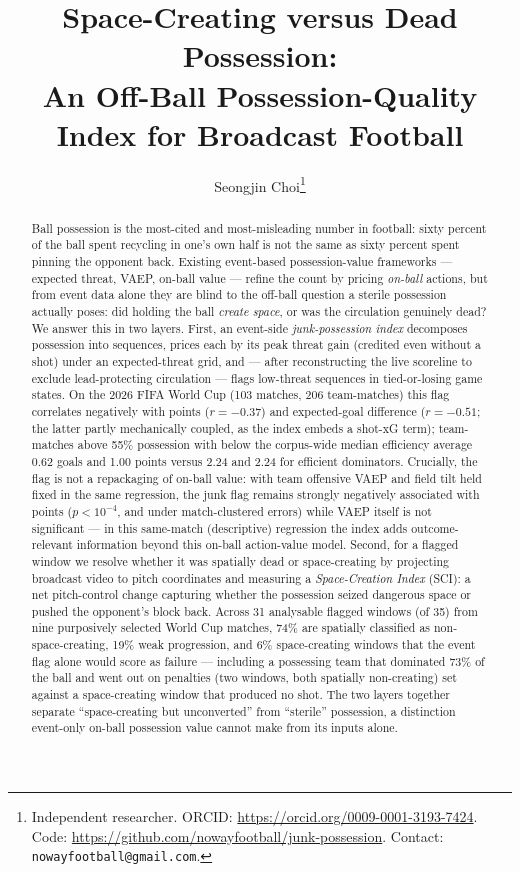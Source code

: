 \documentclass[11pt]{article}
\title{Space-Creating versus Dead Possession:\\An Off-Ball Possession-Quality Index for Broadcast Football}
\author{%
  Seongjin Choi\thanks{Independent researcher.
  ORCID: \url{https://orcid.org/0009-0001-3193-7424}.
  Code: \url{https://github.com/nowayfootball/junk-possession}.
  Contact: \texttt{nowayfootball@gmail.com}.}%
}
\date{}
\begin{document}
\maketitle

\begin{abstract}
Ball possession is the most-cited and most-misleading number in football:
sixty percent of the ball spent recycling in one's own half is not the same as
sixty percent spent pinning the opponent back. Existing event-based possession-value
frameworks --- expected threat, VAEP, on-ball value --- refine the count by
pricing \emph{on-ball} actions, but from event data alone they are blind to the
off-ball question a
sterile possession actually poses: did holding the ball \emph{create space},
or was the circulation genuinely dead? We answer this in two layers. First, an
event-side \emph{junk-possession index} decomposes possession into sequences,
prices each by its peak threat gain (credited even without a shot) under an expected-threat
grid, and --- after reconstructing the live scoreline to exclude
lead-protecting circulation --- flags low-threat sequences in tied-or-losing
game states. On the 2026 FIFA World Cup (103 matches, 206 team-matches) this
flag correlates negatively with points ($r=-0.37$) and expected-goal
difference ($r=-0.51$; the latter partly mechanically coupled, as the index
embeds a shot-xG term); team-matches above 55\% possession with below the
corpus-wide median efficiency average 0.62 goals and 1.00 points versus 2.24 and
2.24 for efficient dominators. Crucially, the flag is not a repackaging of
on-ball value: with team offensive VAEP and field tilt held fixed in the same
regression, the junk flag remains strongly negatively associated with points
($p<10^{-4}$, and under match-clustered errors) while VAEP itself is not
significant --- in this same-match (descriptive) regression the index adds
outcome-relevant information beyond this on-ball action-value model. Second, for
a flagged
window we resolve whether it was spatially dead or space-creating by projecting
broadcast video to pitch
coordinates and measuring a \emph{Space-Creation Index} (SCI): a net
pitch-control change capturing whether the possession seized dangerous space or
pushed the opponent's block back. Across 31 analysable flagged windows (of 35)
from nine purposively selected World Cup matches, 74\% are spatially classified
as non-space-creating,
19\% weak progression, and 6\% space-creating windows that the event flag alone
would score as failure --- including a possessing team that dominated 73\% of the
ball and went out on penalties (two windows, both spatially non-creating) set
against a space-creating window that produced no shot. The two layers together
separate ``space-creating but unconverted'' from ``sterile'' possession, a
distinction event-only on-ball possession value cannot make from its inputs
alone.
\end{abstract}
\end{document}
